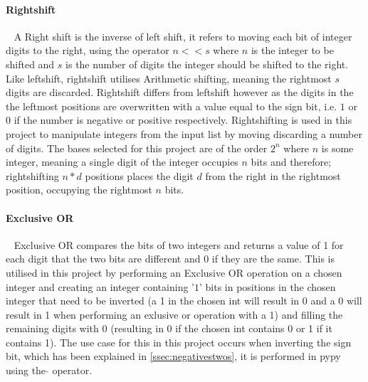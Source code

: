 \documentclass[12pt]{article}
\begin{document}
\paragraph{Rightshift}\
\label{sssec:rightshift}
\newline
A Right shift is the inverse of left shift, it refers to moving each bit of integer digits to the right, using the operator $n << s$ where $n$ is the integer to be shifted and $s$ is the number of digits the integer should be shifted to the right.
\newline
Like leftshift, rightshift utilises Arithmetic shifting, meaning the rightmost $s$ digits are discarded. Rightshift differs from leftshift however as the digits in the the leftmost positions are overwritten with a value equal to the sign bit, i.e. $1$ or $0$ if the number is negative or positive respectively.
\newline\newline
Rightshifting is used in this project to manipulate integers from the input list by moving discarding a number of digits. The bases selected for this project are of the order $2^n$ where $n$ is some integer, meaning a single digit of the integer occupies $n$ bits and therefore; rightshifting $n*d$ positions places the digit $d$ from the right in the rightmost position, occupying the rightmost $n$ bits. 
\pagebreak
\paragraph{Exclusive OR}\
\newline
Exclusive OR compares the bits of two integers and returns a value of 1 for each digit that the two bits are different and 0 if they are the same. This is utilised in this project by performing an Exclusive OR operation on a chosen integer and creating an integer containing '$1$' bits in positions in the chosen integer that need to be inverted (a 1 in the chosen int will result in 0 and a 0 will result in 1 when performing an exlusive or operation with a 1) and filling the remaining digits with 0 (resulting in 0 if the chosen int contains 0 or 1 if it contains 1).
\newline
The use case for this in this project occurs when inverting the sign bit, which has been explained in \ref{ssec:negativestwos}, it is performed in pypy using the $\hat{}$ operator.
\newline
\end{document}
